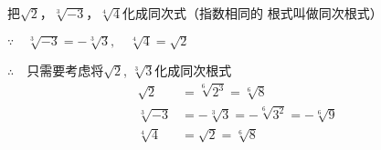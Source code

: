 \begin{example}
    把$\sqrt{2}$，$\sqrt[3]{-3}$，$\sqrt[4]{4}$化成同次式（指数相同的
    根式叫做同次根式）
\end{example}

\begin{solution}
$\because\quad \sqrt[3]{-3}=-\sqrt[3]{3},\quad \sqrt[4]{4}=\sqrt{2}$

$\therefore\quad $只需要考虑将$\sqrt{2}$, $\sqrt[3]{3}$化成同次根式
\[\begin{split}
\sqrt{2}&=\sqrt[6]{2^3}=\sqrt[6]{8}\\
\sqrt[3]{-3}&=-\sqrt[3]{3}=-\sqrt[6]{3^2}=-\sqrt[6]{9}\\
\sqrt[4]{4}&=\sqrt{2}=\sqrt[6]{8}
\end{split}\]
\end{solution}

